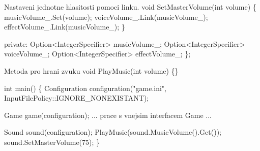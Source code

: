 \begin{DoxyPre}{\ttfamily Nastaveni jednotne hlasitosti pomoci linku.
    void SetMasterVolume(int volume)
    \{
        musicVolume\_.Set(volume);
        voiceVolume\_.Link(musicVolume\_);
        effectVolume\_.Link(musicVolume\_);
    \}}\end{DoxyPre}



\begin{DoxyPre}{\ttfamily private:
    Option<IntegerSpecifier> musicVolume\_;
    Option<IntegerSpecifier> voiceVolume\_;
    Option<IntegerSpecifier> effectVolume\_;
\};}\end{DoxyPre}



\begin{DoxyPre}{\ttfamily Metoda pro hrani zvuku
void PlayMusic(int volume) \{\}}\end{DoxyPre}



\begin{DoxyPre}{\ttfamily int main()
\{
    Configuration configuration("game.ini", InputFilePolicy::IGNORE\_NONEXISTANT);}\end{DoxyPre}



\begin{DoxyPre}{\ttfamily     Game game(configuration);
     ... prace s vnejsim interfacem Game ...}\end{DoxyPre}



\begin{DoxyPre}{\ttfamily     Sound sound(configuration);
    PlayMusic(sound.MusicVolume().Get());
    sound.SetMasterVolume(75);
\}
}\end{DoxyPre}
 
